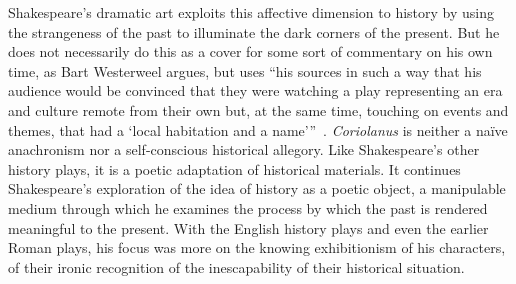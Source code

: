 Shakespeare's dramatic art exploits this affective dimension to history by using the strangeness of the past to illuminate the dark corners of the present.
But he does not necessarily do this as a cover for some sort of commentary on his own time, as Bart Westerweel argues, but uses ``his sources in such a way that his audience would be convinced that they were watching a play representing an era and culture remote from their own but, at the same time, touching on events and themes, that had a `local habitation and a name'''~\cite[203]{westerweel_plutarchs_2001}. 
\emph{Coriolanus} is neither a naïve anachronism nor a self-conscious historical allegory.
Like Shakespeare's other history plays, it is a poetic adaptation of historical materials.
It continues Shakespeare's exploration of the idea of history as a poetic object, a manipulable medium through which he examines the process by which the past is rendered meaningful to the present.
With the English history plays and even the earlier Roman plays, his focus was more on the knowing exhibitionism of his characters, of their ironic recognition of the inescapability of their historical situation.

